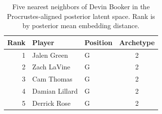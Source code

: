 \begin{table}[htbp]
  \centering\small
  \begin{tabular}{rllc}
    \toprule
    Rank & Player & Position & Archetype \\
    \midrule
    1 & Jalen Green & G & 2 \\
    2 & Zach LaVine & G & 2 \\
    3 & Cam Thomas & G & 2 \\
    4 & Damian Lillard & G & 2 \\
    5 & Derrick Rose & G & 2 \\
    \bottomrule
  \end{tabular}
  \caption{Five nearest neighbors of Devin Booker in the Procrustes-aligned posterior latent space. Rank is by posterior mean embedding distance.}
  \label{tab:Devin_Booker_neighbors}
\end{table}

